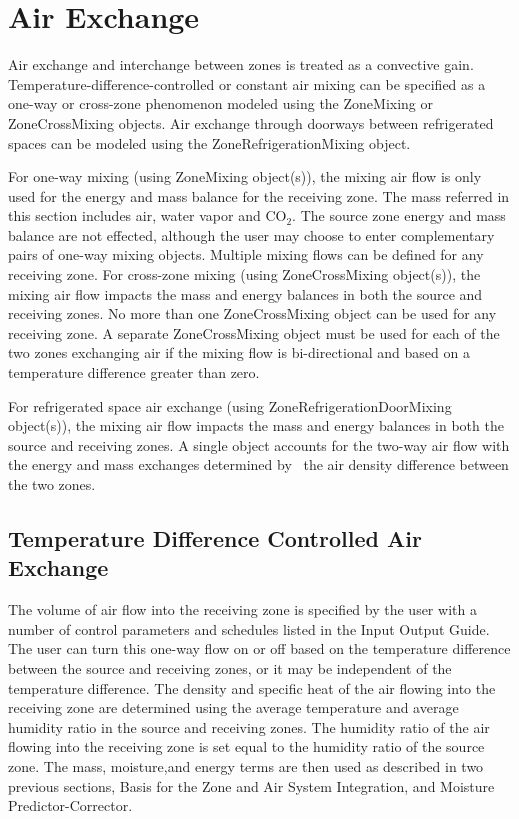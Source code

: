 \section{Air Exchange}\label{air-exchange}

Air exchange and interchange between zones is treated as a convective gain. Temperature-difference-controlled or constant air mixing can be specified as a one-way or cross-zone phenomenon modeled using the ZoneMixing or ZoneCrossMixing objects. Air exchange through doorways between refrigerated spaces can be modeled using the ZoneRefrigerationMixing object.

For one-way mixing (using ZoneMixing object(s)), the mixing air flow is only used for the energy and mass balance for the receiving zone. The mass referred in this section includes air, water vapor and CO\(_{2}\). The source zone energy and mass balance are not effected, although the user may choose to enter complementary pairs of one-way mixing objects. Multiple mixing flows can be defined for any receiving zone. For cross-zone mixing (using ZoneCrossMixing object(s)), the mixing air flow impacts the mass and energy balances in both the source and receiving zones. No more than one ZoneCrossMixing object can be used for any receiving zone. A separate ZoneCrossMixing object must be used for each of the two zones exchanging air if the mixing flow is bi-directional and based on a temperature difference greater than zero.

For refrigerated space air exchange (using ZoneRefrigerationDoorMixing object(s)), the mixing air flow impacts the mass and energy balances in both the source and receiving zones. A single object accounts for the two-way air flow with the energy and mass exchanges determined by~ the air density difference between the two zones.

\subsection{Temperature Difference Controlled Air Exchange}\label{temperature-difference-controlled-air-exchange}

The volume of air flow into the receiving zone is specified by the user with a number of control parameters and schedules listed in the Input Output Guide. The user can turn this one-way flow on or off based on the temperature difference between the source and receiving zones, or it may be independent of the temperature difference. The density and specific heat of the air flowing into the receiving zone are determined using the average temperature and average humidity ratio in the source and receiving zones. The humidity ratio of the air flowing into the receiving zone is set equal to the humidity ratio of the source zone. The mass, moisture,and energy terms are then used as described in two previous sections, Basis for the Zone and Air System Integration, and Moisture Predictor-Corrector.

